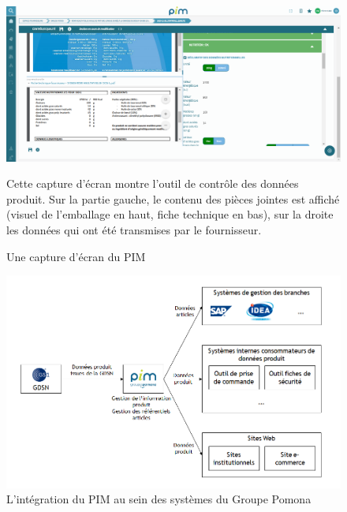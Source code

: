                 \begin{figure}[htpb]
                    \begin{center}
                    \includegraphics[width=\linewidth]{img/Ecran PIM.png}
                    \end{center}
                    Cette capture d'écran montre l'outil de contrôle des données produit. Sur la partie gauche, le contenu des pièces jointes est affiché (visuel de l'emballage en haut, fiche technique en bas), sur la droite les données qui ont été transmises par le fournisseur.
                    \caption{Une capture d'écran du PIM}
                    \label{fig:ecran_PIM}
                \end{figure} 

                \begin{figure}[htpb]
                    \begin{center}
                    \includegraphics[width=\linewidth]{img/PIM_integration.png}
                    \end{center}
                    \caption{L'intégration du PIM au sein des systèmes du Groupe Pomona}
                    \label{fig:integration_PIM}
                \end{figure}

